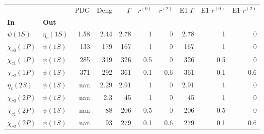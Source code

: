 \begin{tabular}{l|l|r|r|r|r|r|r|r|r}
\toprule
                &            &  PDG &  Deng &  $\Gamma$ &  $r^{(0)}$ &  $r^{(2)}$ &  E1-$\Gamma$ &  E1-$r^{(0)}$ &  E1-$r^{(2)}$ \\
\textbf{In} & \textbf{Out} &      &       &           &            &            &              &               &               \\
\midrule
\textbf{$\psi(1S)$} & \textbf{$\eta_{c}(1S)$} & 1.58 &  2.44 &      2.78 &          1 &          0 &         2.78 &             1 &             0 \\
\textbf{$\chi_{c0}(1P)$} & \textbf{$\psi(1S)$} &  133 &   179 &       167 &          1 &          0 &          167 &             1 &             0 \\
\textbf{$\chi_{c1}(1P)$} & \textbf{$\psi(1S)$} &  285 &   319 &       326 &        0.5 &          0 &          326 &           0.5 &             0 \\
\textbf{$\chi_{c2}(1P)$} & \textbf{$\psi(1S)$} &  371 &   292 &       361 &        0.1 &        0.6 &          361 &           0.1 &           0.6 \\
\textbf{$\eta_{c}(2S)$} & \textbf{$\psi(1S)$} &  nan &  2.29 &      2.91 &          1 &          0 &         2.91 &             1 &             0 \\
\textbf{$\chi_{c0}(2P)$} & \textbf{$\psi(1S)$} &  nan &   2.3 &        45 &          1 &          0 &           45 &             1 &             0 \\
\textbf{$\chi_{c1}(2P)$} & \textbf{$\psi(1S)$} &  nan &    88 &       206 &        0.5 &          0 &          206 &           0.5 &             0 \\
\textbf{$\chi_{c2}(2P)$} & \textbf{$\psi(1S)$} &  nan &    93 &       279 &        0.1 &        0.6 &          279 &           0.1 &           0.6 \\
\bottomrule
\end{tabular}
